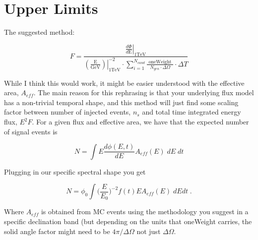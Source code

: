 \chapter{Upper Limits}

The suggested method: 

\begin{equation}
F = \frac { \left. \frac { d \Phi } { d \mathrm { E } } \right| _ { 1 \mathrm { TeV } } } { \left. \left( \frac { \mathrm { E } } { \mathrm { GeV } } \right) \right| _ { 1 \mathrm { TeV } } ^ { - 2 } \cdot \sum _ { i = 1 } ^ { N _ { c a n d } } \frac { \text { oneWeight } } { N _ { g e n } \cdot \Delta \Omega } \cdot \Delta T }
\end{equation}

While I think this would work, it might be easier understood with the effective area, $A_{eff}$. The main reason for this rephrasing is that your underlying flux model has a non-trivial temporal shape, and this method will just find some scaling factor between number of injected events, $n_s$ and total time integrated energy flux, $E^2F$. For a given flux and effective area, we have that the expected number of signal events is 

\begin{equation}
    N = \int E \frac{d \phi(E,t)}{dE} A_{eff}(E) \;  dE \; dt
\end{equation}

Plugging in our specific spectral shape you get

\begin{equation}
    N = \phi_0 \int \Big( \frac{E}{E_0} \Big)^{-2} f(t) E A_{eff}(E) \; dE dt \; .
\end{equation}

Where $A_{eff}$ is obtained from MC events using the methodology you suggest in a specific declination band (but depending on the units that oneWeight carries, the solid angle factor might need to be $4\pi / \Delta \Omega$ not just $\Delta \Omega$.